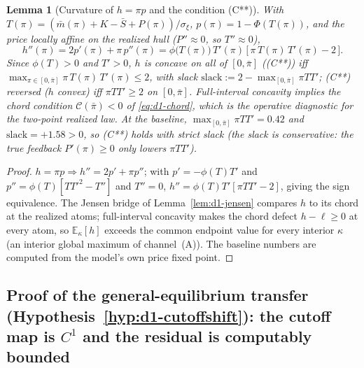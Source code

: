 \documentclass[11pt]{article}
\newtheorem{lemma}{Lemma}
\newcommand{\E}{\mathbb{E}}
\newcommand{\1}{\mathbf{1}}
\begin{document}
\begin{lemma}[Curvature of $h=\pi p$ and the condition \textup{(C**)}]
\label{lem:d1-curvature}
With $T(\pi)=(\bar m(\pi)+K-\bar S+P(\pi))/\sigma_\xi$, $p(\pi)=1-\Phi(T(\pi))$,
and the price locally affine on the realized hull ($P''\approx0$, so
$T''\approx0$),
\begin{equation}
  h''(\pi)=2p'(\pi)+\pi\,p''(\pi)
  =\phi\!\big(T(\pi)\big)\,T'(\pi)\,\big[\,\pi\,T(\pi)\,T'(\pi)-2\,\big].
  \label{eq:d1-hpp}
\end{equation}
Since $\phi(T)>0$ and $T'>0$, $h$ is concave on all of $[0,\bar\pi]$
(\textup{(C**)}) iff $\max_{\pi\in[0,\bar\pi]}\pi\,T(\pi)\,T'(\pi)\le 2$, with
slack $\mathrm{slack}:=2-\max_{[0,\bar\pi]}\pi T T'$; \textup{(C**)} reversed
($h$ convex) iff $\pi T T'\ge2$ on $[0,\bar\pi]$. Full-interval concavity
implies the chord condition $\mathcal{C}(\bar\pi)<0$ of \eqref{eq:d1-chord},
which is the operative diagnostic for the two-point realized law. At the
baseline, $\max_{[0,\bar\pi]}\pi T T'=0.42$ and $\mathrm{slack}=+1.58>0$, so
\textup{(C**)} holds with strict slack (the slack is conservative: the true
feedback $P'(\pi)\ge0$ only lowers $\pi T T'$).
\end{lemma}

\begin{proof}
$h=\pi p\Rightarrow h''=2p'+\pi p''$; with $p'=-\phi(T)T'$ and
$p''=\phi(T)[T T'^2-T'']$ and $T''=0$, $h''=\phi(T)T'[\pi T T'-2]$, giving the
sign equivalence. The Jensen bridge of Lemma~\ref{lem:d1-jensen} compares $h$ to
its chord at the realized atoms; full-interval concavity makes the chord defect
$h-\ell\ge0$ at every atom, so $\E_\kappa[h]$ exceeds the common endpoint value
for every interior $\kappa$ (an interior global maximum of channel~(A)). The
baseline numbers are computed from the model's own price fixed point.
\end{proof}

\subsection{Proof of the general-equilibrium transfer (Hypothesis~\ref{hyp:d1-cutoffshift}): the cutoff map is $C^1$ and the residual is computably bounded}
\label{app:proof-d1-GE}
\end{document}
